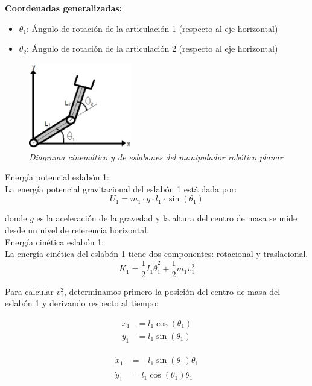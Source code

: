 \textbf{Coordenadas generalizadas:}
\begin{itemize}[label=$\bullet$]
    \item $\theta_1$: Ángulo de rotación de la articulación 1 (respecto al eje horizontal)
    \item $\theta_2$: Ángulo de rotación de la articulación 2 (respecto al eje horizontal)
\end{itemize}
\begin{figure}[H]
    \centering
    \includegraphics[width=0.4\textwidth]{img/DCL_brazo.png}
    \caption{\textit{Diagrama cinemático y de eslabones del manipulador robótico planar}}
    \label{fig:DCL_brazo}
\end{figure}

Energía potencial eslabón 1:\\
\noindent
La energía potencial gravitacional del eslabón 1 está dada por:
\begin{equation}
U_1 = m_1 \cdot g \cdot l_1 \cdot \sin(\theta_1)
\end{equation}

donde $g$ es la aceleración de la gravedad y la altura del centro de masa se mide desde un nivel de referencia horizontal.\\

Energía cinética eslabón 1:\\
\noindent
La energía cinética del eslabón 1 tiene dos componentes: rotacional y traslacional.
\begin{equation}
K_1 = \frac{1}{2} I_1 \dot{\theta}_1^2 + \frac{1}{2} m_1 v_1^2
\end{equation}

Para calcular $v_1^2$, determinamos primero la posición del centro de masa del eslabón 1 y derivando respecto al tiempo:

\noindent
\begin{minipage}{0.48\textwidth}
\begin{align}
x_1 &= l_1 \cos(\theta_1) \\
y_1 &= l_1 \sin(\theta_1)
\end{align}
\end{minipage}
\hfill
\begin{minipage}{0.48\textwidth}
\begin{align}
\dot{x}_1 &= -l_1 \sin(\theta_1) \dot{\theta}_1 \\
\dot{y}_1 &= l_1 \cos(\theta_1) \dot{\theta}_1
\end{align}
\end{minipage}

